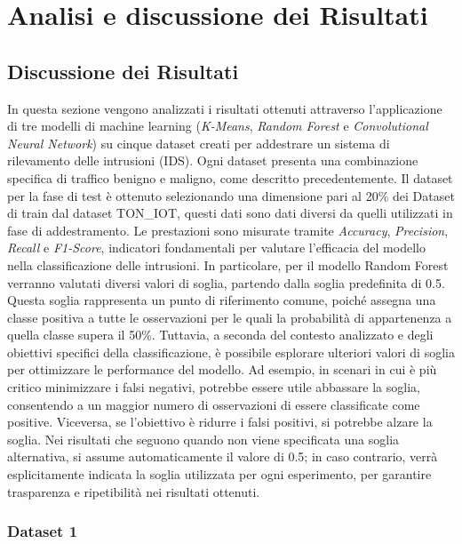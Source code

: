 \chapter{Analisi e discussione dei Risultati}

\section{Discussione dei Risultati}

In questa sezione vengono analizzati i risultati ottenuti attraverso l'applicazione di tre modelli di machine learning (\textit{K-Means}, \textit{Random Forest} e \textit{Convolutional Neural Network}) su cinque dataset creati per addestrare un sistema di rilevamento delle intrusioni (IDS). Ogni dataset presenta una combinazione specifica di traffico benigno e maligno, come descritto precedentemente. Il dataset per la fase di test è ottenuto selezionando una dimensione pari al 20\% dei Dataset di train dal dataset TON\_IOT, questi dati sono dati diversi da quelli utilizzati in fase di addestramento.
Le prestazioni sono misurate tramite \textit{Accuracy}, \textit{Precision}, \textit{Recall} e \textit{F1-Score}, indicatori fondamentali per valutare l'efficacia del modello nella classificazione delle intrusioni.
In particolare, per il modello Random Forest verranno valutati diversi valori di soglia, partendo dalla soglia predefinita di 0.5. Questa soglia rappresenta un punto di riferimento comune, poiché assegna una classe positiva a tutte le osservazioni per le quali la probabilità di appartenenza a quella classe supera il 50\%. Tuttavia, a seconda del contesto analizzato e degli obiettivi specifici della classificazione, è possibile esplorare ulteriori valori di soglia per ottimizzare le performance del modello. 
Ad esempio, in scenari in cui è più critico minimizzare i falsi negativi, potrebbe essere utile abbassare la soglia, consentendo a un maggior numero di osservazioni di essere classificate come positive. Viceversa, se l'obiettivo è ridurre i falsi positivi, si potrebbe alzare la soglia. 
Nei risultati che seguono quando non viene specificata una soglia alternativa, si assume automaticamente il valore di 0.5; in caso contrario, verrà esplicitamente indicata la soglia utilizzata per ogni esperimento, per garantire trasparenza e ripetibilità nei risultati ottenuti.


\subsection{Dataset 1}

